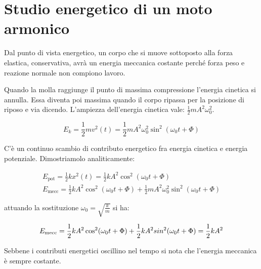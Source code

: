 \section{Studio energetico di un moto armonico}

Dal punto di vista energetico, un corpo che si muove sottoposto alla forza elastica, conservativa, avrà un energia meccanica costante perché forza peso e reazione normale non compiono lavoro.

Quando la molla raggiunge il punto di massima compressione l'energia cinetica si annulla. Essa diventa poi massima quando il corpo ripassa per la posizione di riposo e via dicendo.
L'ampiezza dell'energia cinetica vale: $\frac{1}{2}mA^2\omega_0^2$.

\[
	E_k=\frac{1}{2}mv^2(t)=\frac{1}{2}mA^2\omega_0^2\sin^2(\omega_0 t+\Phi)
\]

C'è un continuo scambio di contributo energetico fra energia cinetica e energia potenziale. Dimostriamolo analiticamente:

\begin{gather*}
	E_{\text{pot}}=\frac{1}{2}kx^2(t)=\frac{1}{2}kA^2\cos^2(\omega_0 t+\Phi) \\
	E_{\text{mecc}}=\frac{1}{2}kA^2\cos^2(\omega_0 t+\Phi)+\frac{1}{2}mA^2\omega_0^2\sin^2(\omega_0 t+\Phi)
\end{gather*}

attuando la sostituzione $\omega_0=\sqrt{\frac{k}{m}}$ si ha:

\[
	E_{\text{mecc}}=\frac{1}{2}kA^2\cos^2(\omega_0 t+\Phi)+\frac{1}{2}kA^2\\sin^2(\omega_0 t+\Phi)=\frac{1}{2}kA^2
\]

Sebbene i contributi energetici oscillino nel tempo si nota che l'energia meccanica è sempre costante.

